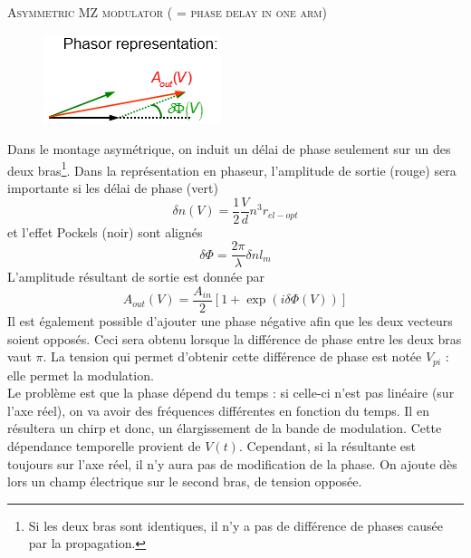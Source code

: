 \textsc{Asymmetric MZ modulator ( = phase delay in one arm)}\\
\begin{figure}
	\vspace{-5mm}
	\includegraphics[scale=0.6]{ch4/image29}
	\end{figure}
Dans le montage asymétrique, on induit un délai de phase seulement sur un des deux bras\footnote{
Si les deux bras sont identiques, il n'y a pas de différence de phases causée par la propagation.}.
Dans la représentation en phaseur, l'amplitude de sortie (rouge) sera importante si les délai de
phase (vert) 
\begin{equation}
\delta n\left( V \right) = \frac{1}{2}\frac{V}{d}{n^3}{r_{el - opt}}
\end{equation}
et l'effet Pockels (noir) sont alignés
\begin{equation}
\delta \Phi = \frac{{2\pi }}{\lambda }\delta n{l_m}
\end{equation}
L'amplitude résultant de sortie est donnée par
\begin{equation}
{A_{out}}(V) = \frac{{{A_{in}}}}{2}\left[ {1+ \exp \left( {i\delta \Phi \left( V \right)} \right)} \right]
\end{equation}
Il est également possible d'ajouter une phase négative afin que les deux vecteurs soient opposés. Ceci
sera obtenu lorsque la différence de phase entre les deux bras vaut $\pi$. La tension qui permet 
d'obtenir cette différence de phase est notée $V_{pi}$ : elle permet la modulation.\\

Le problème est que la phase dépend du temps : si celle-ci n'est pas linéaire (sur l'axe réel), on
va avoir des fréquences différentes en fonction du temps. Il en résultera un chirp et donc, un
élargissement de la bande de modulation. Cette dépendance temporelle provient de $V(t)$. Cependant,
si la résultante est toujours sur l'axe réel, il  n'y aura pas de modification de la phase. On 
ajoute dès lors un champ électrique sur le second bras, de tension opposée.\\

